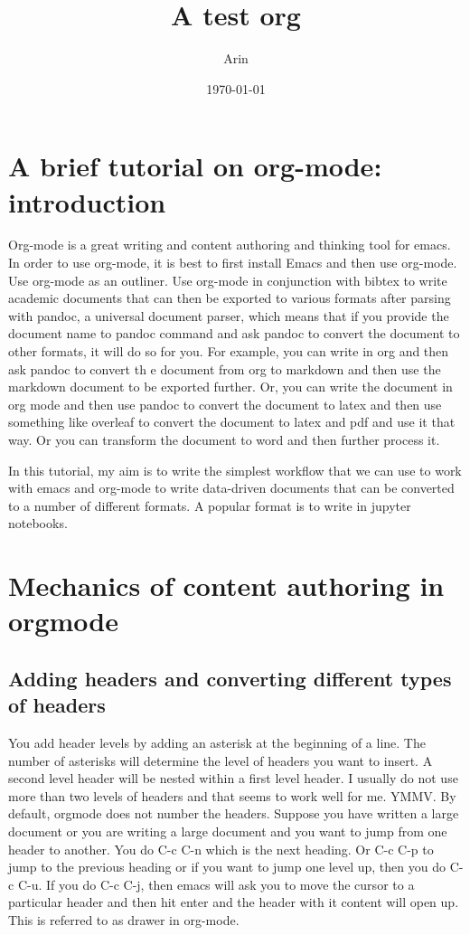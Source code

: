\documentclass[11pt]{article}
\author{Arin}
\date{\today}
\title{A test org}
\begin{document}
\maketitle
\tableofcontents


\section{A brief tutorial on org-mode: introduction}
\label{sec:orga518062}

Org-mode is a great writing and content authoring and thinking tool for emacs. In order to use org-mode, it is best to first install Emacs and then use org-mode. Use org-mode as an outliner. Use org-mode in conjunction with bibtex to write academic documents that can then be exported to various formats after parsing with pandoc, a universal document parser, which means that if you provide the document name to pandoc command and ask pandoc to convert the document to other formats, it will do so for you. For example, you can write in org and then ask pandoc to convert th
e document from org to markdown and then use the markdown document to be exported further. Or, you can write the document in org  mode and then use pandoc to convert the document to latex and then use something like overleaf to convert the document to latex and pdf and use it that way. Or you can transform the document to word and then further process it.

In this tutorial, my aim is to write the simplest workflow that we can use to work with emacs and org-mode to write data-driven documents that can be converted to a number of different formats. A popular format is to write in jupyter notebooks.

\section{Mechanics of content authoring in orgmode}
\label{sec:orgca468d9}

\subsection{Adding headers and converting different types of headers}
\label{sec:orgc82d56d}
You add header levels by adding an asterisk at the beginning of a line. The number of asterisks will determine the level of headers you want to insert. A second level header will be nested within a first level header. I usually do not use more than two levels of headers and that seems to work well for me. YMMV.
By default, orgmode does not number the headers.
Suppose you have written a large document or you are writing a large document and you want to jump from one header to another. You do C-c C-n which is the next heading. Or C-c C-p to jump to the previous heading or if you want to jump  one level up, then you do C-c C-u. If you do C-c C-j, then emacs will ask you to move the cursor to a particular header and then hit enter and the header with it content will open up. This is referred to as drawer in org-mode.
\end{document}
